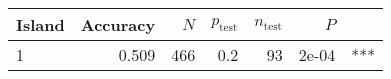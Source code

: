 
\begin{tabular}{lrrrrrl}
\toprule
Island & Accuracy & $N$ & $p_{\mbox{test}}$ & $n_{\mbox{test}}$ & $P$ & \\
\midrule
1 & 0.509 & 466 & 0.2 & 93 & 2e-04 & ***\\
\bottomrule
\end{tabular}

